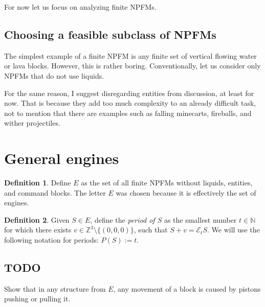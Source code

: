 \documentclass[12pt]{article}
\newcommand{\Z}{\mathbb{Z}}
\newcommand{\N}{\mathbb{N}}
\newcommand{\ev}{\mathcal{E}}
\theoremstyle{remark}
\theoremstyle{definition}
\newtheorem{definition}{Definition}
\begin{document}
For now let us focus on analyzing finite NPFMs.

\subsection{Choosing a feasible subclass of NPFMs}

The simplest example of a finite NPFM is any finite set of vertical flowing water or lava blocks. However, this is rather boring. Conventionally, let us consider only NPFMs that do not use liquids.

For the same reason, I suggest disregarding entities from discussion, at least for now. That is because they add too much complexity to an already difficult task,
not to mention that there are examples such as falling minecarts, fireballs, and wither projectiles.

\section{General engines}

\begin{definition}
    Define $E$ as the set of all finite NPFMs without liquids, entities, and command blocks. The letter $E$ was chosen because it is effectively the set of engines.
\end{definition}

\begin{definition}
    Given $S \in E$, define the \emph{period of $S$} as the smallest number $t\in\N$ for which there exists $v\in\Z^3\setminus\{(0,0,0)\}$, such that $S+v=\ev_tS$.
    We will use the following notation for periods: $P(S):=t$.
\end{definition}

\subsection{TODO}
Show that in any structure from $E$, any movement of a block is caused by pistons pushing or pulling it.


\end{document}
